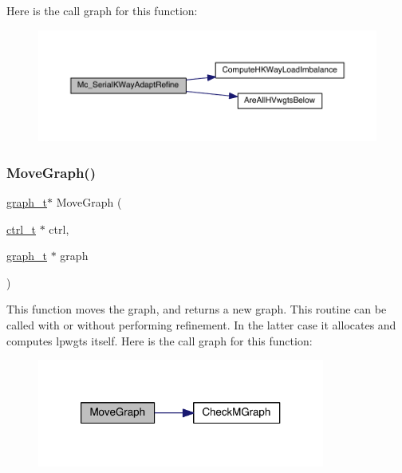 Here is the call graph for this function\+:\nopagebreak
\begin{figure}[H]
\begin{center}
\leavevmode
\includegraphics[width=350pt]{a00951_aca801701a68b2602598dcaaaff59fdff_cgraph}
\end{center}
\end{figure}
\mbox{\label{a00951_af9a11fa7ca54861bb143ffcf0d2298f2}} 
\subsubsection{\texorpdfstring{Move\+Graph()}{MoveGraph()}}
{\footnotesize\ttfamily \hyperlink{a00734}{graph\+\_\+t}$\ast$ Move\+Graph (\begin{DoxyParamCaption}\item[{\hyperlink{a00742}{ctrl\+\_\+t} $\ast$}]{ctrl,  }\item[{\hyperlink{a00734}{graph\+\_\+t} $\ast$}]{graph }\end{DoxyParamCaption})}

This function moves the graph, and returns a new graph. This routine can be called with or without performing refinement. In the latter case it allocates and computes lpwgts itself. Here is the call graph for this function\+:\nopagebreak
\begin{figure}[H]
\begin{center}
\leavevmode
\includegraphics[width=268pt]{a00951_af9a11fa7ca54861bb143ffcf0d2298f2_cgraph}
\end{center}
\end{figure}
\mbox{\label{a00951_aacb7a499eee88753d53d78b4f0c6c7ec}} 
